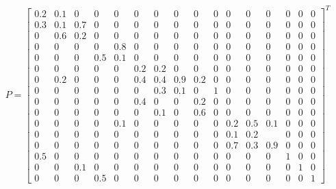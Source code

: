\documentclass[]{article}
\begin{document}
\[
    P = \left[ \begin{array}{rrrrrrrrrrrrrrrr}
    0.2 & 0.1 & 0   & 0   & 0   & 0   & 0   & 0   & 0   & 0 & 0   & 0   & 0   & 0 & 0 & 0 \\
    0.3 & 0.1 & 0.7 & 0   & 0   & 0   & 0   & 0   & 0   & 0 & 0   & 0   & 0   & 0 & 0 & 0 \\
    0   & 0.6 & 0.2 & 0   & 0   & 0   & 0   & 0   & 0   & 0 & 0   & 0   & 0   & 0 & 0 & 0 \\
    0   & 0   & 0   & 0   & 0.8 & 0   & 0   & 0   & 0   & 0 & 0   & 0   & 0   & 0 & 0 & 0 \\
    0   & 0   & 0   & 0.5 & 0.1 & 0   & 0   & 0   & 0   & 0 & 0   & 0   & 0   & 0 & 0 & 0 \\
    0   & 0   & 0   & 0   & 0   & 0.2 & 0.2 & 0   & 0   & 0 & 0   & 0   & 0   & 0 & 0 & 0 \\
    0   & 0.2 & 0   & 0   & 0   & 0.4 & 0.4 & 0.9 & 0.2 & 0 & 0   & 0   & 0   & 0 & 0 & 0 \\
    0   & 0   & 0   & 0   & 0   & 0   & 0.3 & 0.1 & 0   & 1 & 0   & 0   & 0   & 0 & 0 & 0 \\
    0   & 0   & 0   & 0   & 0   & 0.4 & 0   & 0   & 0.2 & 0 & 0   & 0   & 0   & 0 & 0 & 0 \\
    0   & 0   & 0   & 0   & 0   & 0   & 0.1 & 0   & 0.6 & 0 & 0   & 0   & 0   & 0 & 0 & 0 \\
    0   & 0   & 0   & 0   & 0.1 & 0   & 0   & 0   & 0   & 0 & 0.2 & 0.5 & 0.1 & 0 & 0 & 0 \\
    0   & 0   & 0   & 0   & 0   & 0   & 0   & 0   & 0   & 0 & 0.1 & 0.2 &     & 0 & 0 & 0 \\
    0   & 0   & 0   & 0   & 0   & 0   & 0   & 0   & 0   & 0 & 0.7 & 0.3 & 0.9 & 0 & 0 & 0 \\
    0.5 & 0   & 0   & 0   & 0   & 0   & 0   & 0   & 0   & 0 & 0   & 0   & 0   & 1 & 0 & 0 \\
    0   & 0   & 0.1 & 0   & 0   & 0   & 0   & 0   & 0   & 0 & 0   & 0   & 0   & 0 & 1 & 0 \\
    0   & 0   & 0   & 0.5 & 0   & 0   & 0   & 0   & 0   & 0 & 0   & 0   & 0   & 0 & 0 & 1
    \end{array}\right]^T
\]
\end{document}
